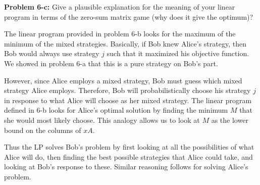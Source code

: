 \documentclass[psamsfonts]{amsart}
\newenvironment{sol}{\vspace{0.25cm}{\large \bfseries Solution:}}{\qedsymbol}
\newenvironment{prob}[1]{\begin{framed}{\large \bfseries Problem #1:}}{\end{framed}}
\begin{document}
\begin{prob}{6-c}
Give a plausible explanation for the meaning of your linear program in terms of the zero-sum matrix game (why does it give the optimum)?
\end{prob}
\begin{sol}
The linear program provided in problem 6-b looks for the maximum of the minimum of the mixed strategies. Basically, if Bob knew Alice's strategy, then Bob would always use strategy $j$ such that it maximized his objective function. We showed in problem 6-a that this is a pure strategy on Bob's part. 

However, since Alice employs a mixed strategy, Bob must guess which mixed strategy Alice employs. Therefore, Bob will probabilistically choose his strategy $j$ in response to what Alice will choose as her mixed strategy. The linear program defined in 6-b looks for Alice's optimal solution by finding the minimum $M$ that she would most likely choose. This analogy allows us to look at $M$ as the lower bound on the columns of $xA$.

Thus the LP solves Bob's problem by first looking at all the possibilities of what Alice will do, then finding the best possible strategies that Alice could take, and looking at Bob's response to these. Similar reasoning follows for solving Alice's problem.
\end{sol}
\end{document}
